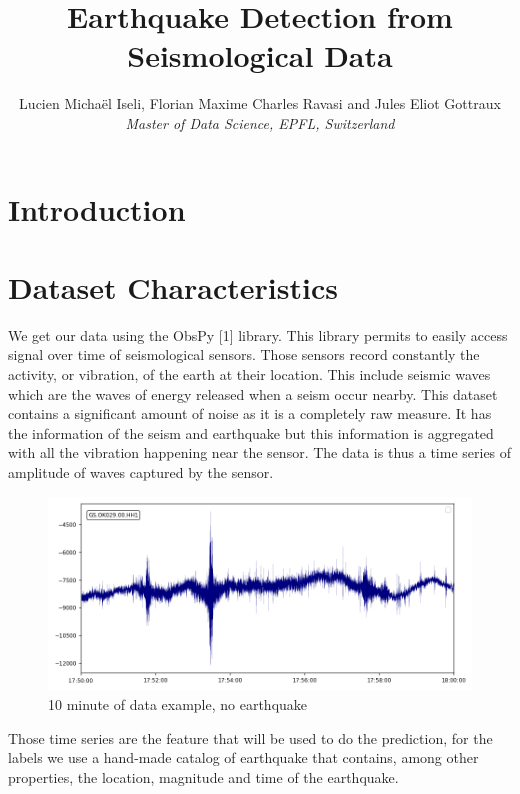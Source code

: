 \documentclass[10pt,conference,compsocconf]{IEEEtran}
\begin{document}
\title{Earthquake Detection from Seismological Data}

\author{
  Lucien Michaël Iseli, Florian Maxime Charles Ravasi and Jules Eliot Gottraux\\
  \textit{Master of Data Science, EPFL, Switzerland}
}

\maketitle
\section{Introduction}

\section{Dataset Characteristics}
We get our data using the ObsPy [1] library. This library permits to easily access signal over time of seismological sensors. Those sensors record  constantly the activity, or vibration, of the earth at their location. This include seismic waves which are the waves of energy released when a seism occur nearby. This dataset contains a significant amount of noise as it is a completely raw measure. It has the information of the seism and earthquake but this information is aggregated with all the vibration happening near the sensor. The data is thus a time series of amplitude of waves captured by the sensor.

\begin{figure}[h]
  \centering
	\includegraphics[width=\columnwidth]{../processed-data/10min-example-2018-06-30T17:50.png}
  \caption{10 minute of data example, no earthquake}
	\label{fig:10min-example}
\end{figure}

Those time series are the feature that will be used to do the prediction, for the labels we use a hand-made catalog of earthquake that contains, among other properties, the location, magnitude and time of the earthquake.\newline \newline
\end{document}
